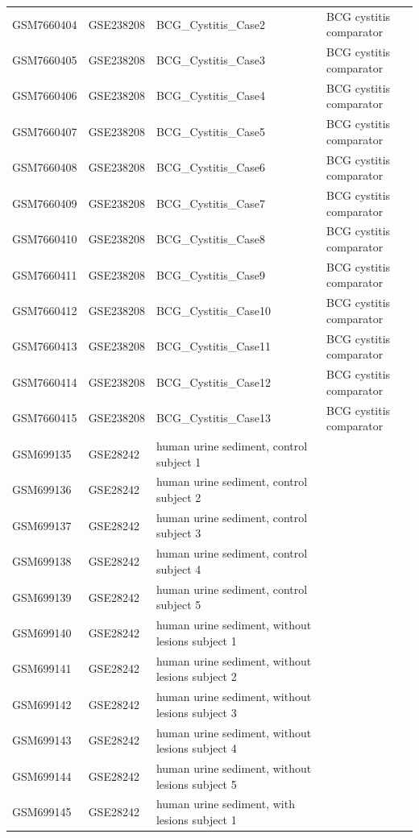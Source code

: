 \begin{longtable}{llp{}l}
GSM7660404 & GSE238208 & BCG\_Cystitis\_Case2 & BCG cystitis comparator \\
GSM7660405 & GSE238208 & BCG\_Cystitis\_Case3 & BCG cystitis comparator \\
GSM7660406 & GSE238208 & BCG\_Cystitis\_Case4 & BCG cystitis comparator \\
GSM7660407 & GSE238208 & BCG\_Cystitis\_Case5 & BCG cystitis comparator \\
GSM7660408 & GSE238208 & BCG\_Cystitis\_Case6 & BCG cystitis comparator \\
GSM7660409 & GSE238208 & BCG\_Cystitis\_Case7 & BCG cystitis comparator \\
GSM7660410 & GSE238208 & BCG\_Cystitis\_Case8 & BCG cystitis comparator \\
GSM7660411 & GSE238208 & BCG\_Cystitis\_Case9 & BCG cystitis comparator \\
GSM7660412 & GSE238208 & BCG\_Cystitis\_Case10 & BCG cystitis comparator \\
GSM7660413 & GSE238208 & BCG\_Cystitis\_Case11 & BCG cystitis comparator \\
GSM7660414 & GSE238208 & BCG\_Cystitis\_Case12 & BCG cystitis comparator \\
GSM7660415 & GSE238208 & BCG\_Cystitis\_Case13 & BCG cystitis comparator \\
GSM699135 & GSE28242 & human urine sediment, control subject 1 &  \\
GSM699136 & GSE28242 & human urine sediment, control subject 2 &  \\
GSM699137 & GSE28242 & human urine sediment, control subject 3 &  \\
GSM699138 & GSE28242 & human urine sediment, control subject 4 &  \\
GSM699139 & GSE28242 & human urine sediment, control subject 5 &  \\
GSM699140 & GSE28242 & human urine sediment, without lesions subject 1 &  \\
GSM699141 & GSE28242 & human urine sediment, without lesions subject 2 &  \\
GSM699142 & GSE28242 & human urine sediment, without lesions subject 3 &  \\
GSM699143 & GSE28242 & human urine sediment, without lesions subject 4 &  \\
GSM699144 & GSE28242 & human urine sediment, without lesions subject 5 &  \\
GSM699145 & GSE28242 & human urine sediment, with lesions subject 1 &  \\

\end{longtable}
